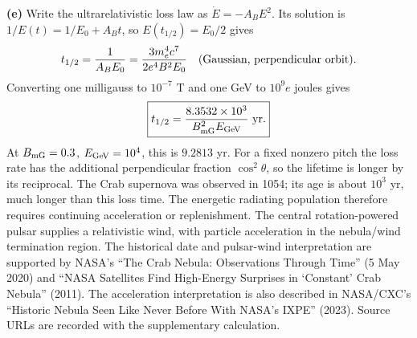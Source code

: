 \textbf{(e)} Write the ultrarelativistic loss law as $\dot E=-A_BE^2$.
Its solution is $1/E(t)=1/E_0+A_Bt$, so $E(t_{1/2})=E_0/2$ gives
\[
t_{1/2}=\frac1{A_BE_0}
=\frac{3m_e^4c^7}{2e^4B^2E_0}
\quad\hbox{(Gaussian, perpendicular orbit)}.
\]
Converting one milligauss to $10^{-7}$ T and one GeV to
$10^9e$ joules gives
\[
\boxed{t_{1/2}=\frac{8.3532\times10^3}
{B_{\rm mG}^2E_{\rm GeV}}\ {\rm yr}.}
\]
At $B_{\rm mG}=0.3$, $E_{\rm GeV}=10^4$, this is $9.2813$ yr.
For a fixed nonzero pitch the loss rate has the additional perpendicular
fraction $\cos^2\theta$, so the lifetime is longer by its reciprocal.
The Crab supernova was observed in 1054; its age is about $10^3$ yr,
much longer than this loss time. The energetic radiating population
therefore requires continuing acceleration or replenishment. The central
rotation-powered pulsar supplies a relativistic wind, with particle
acceleration in the nebula/wind termination region.
The historical date and pulsar-wind interpretation are supported by
NASA's ``The Crab Nebula: Observations Through Time'' (5 May 2020) and
``NASA Satellites Find High-Energy Surprises in `Constant' Crab Nebula''
(2011). The acceleration interpretation is also described in NASA/CXC's
``Historic Nebula Seen Like Never Before With NASA's IXPE'' (2023).
Source URLs are recorded with the supplementary calculation.

